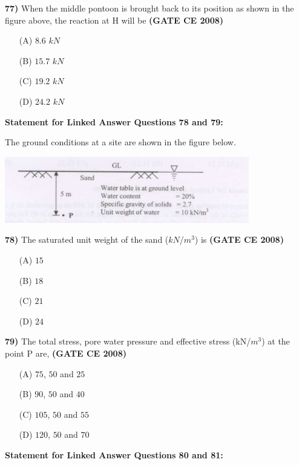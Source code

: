 \documentclass[journal]{IEEEtran}
\begin{document}
\begin{enumerate}
\textbf{77)} \hspace{0.2cm} When the middle pontoon is brought back to its position as shown in the figure above, the reaction at H will be \textbf{(GATE CE 2008)}
\begin{itemize}
    \item[(A)] $8.6$ $kN$
    \item[(B)] $15.7$ $kN$
    \item[(C)] $19.2$ $kN$
    \item[(D)] $24.2$ $kN$
\end{itemize}

\vspace{0.5cm}
\textbf{Statement for Linked Answer Questions 78 and 79:}

The ground conditions at a site are shown in the figure below.

\vspace{0.3cm}
\includegraphics[width=0.8\textwidth]{image/image12.png}
\vspace{0.3cm}

\textbf{78)} The saturated unit weight of the sand ($kN$/$m^{3}$) is \textbf{(GATE CE 2008)}
\begin{itemize}
    \item[(A)] $15$
    \item[(B)] $18$
    \item[(C)] $21$
    \item[(D)] $24$
\end{itemize}

\textbf{79)} The total stress, pore water pressure and effective stress (kN/$m^{3}$) at the point P are,  \textbf{(GATE CE 2008)}
\begin{itemize}
    \item[(A)] $75$, $50$ and $25$
    \item[(B)] $90$, $50$ and $40$
    \item[(C)] $105$, $50$ and $55$
    \item[(D)] $120$, $50$ and $70$
\end{itemize}



\textbf{Statement for Linked Answer Questions 80 and 81:}


\end{enumerate}
\end{document}

